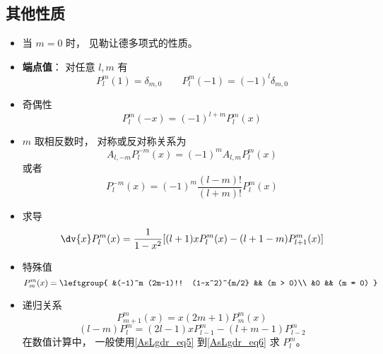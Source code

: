 \subsection{其他性质}
\begin{itemize}
\item 当 $m = 0$ 时， 见勒让德多项式的性质。

\item \textbf{端点值}： 对任意 $l, m$ 有
\begin{equation}\label{AsLgdr_eq2}
P_l^m(1) = \delta_{m, 0}
\qquad
P_l^m(-1) = (-1)^l \delta_{m, 0}
\end{equation}

\item 奇偶性
\begin{equation}
P_l^m(-x) = (-1)^{l+m}P_l^m(x)
\end{equation}

\item $m$ 取相反数时， 对称或反对称关系为
\begin{equation}
A_{l,-m} P_l^{-m}(x) = (-1)^m A_{l,m} P_l^m(x)
\end{equation}
或者
\begin{equation}
P_l^{-m}(x) = (-1)^m \frac{(l-m)!}{(l+m)!} P_l^m(x)
\end{equation}
\item 求导
\begin{equation}
\dv{x} P_l^m(x) = \frac{1}{1-x^2} [(l+1)xP_l^m(x) - (l+1-m)P_{l+1}^m(x)]
\end{equation}
\item 特殊值
\begin{equation}\label{AsLgdr_eq5} %
P_m^m(x) = \leftgroup{
&(-1)^m (2m-1)!! (1-x^2)^{m/2} && (m > 0)\\
&0 && (m = 0)
}\end{equation}
\item 递归关系
\begin{equation} %
P_{m+1}^m(x) = x (2m + 1) P_m^m(x)
\end{equation}
\begin{equation}\label{AsLgdr_eq6} %
(l-m) P_l^m = (2l-1) x P_{l-1}^m - (l+m-1) P_{l-2}^m
\end{equation}
在数值计算中， 一般使用\autoref{AsLgdr_eq5} 到\autoref{AsLgdr_eq6} 求 $P_l^m$。
\end{itemize}
